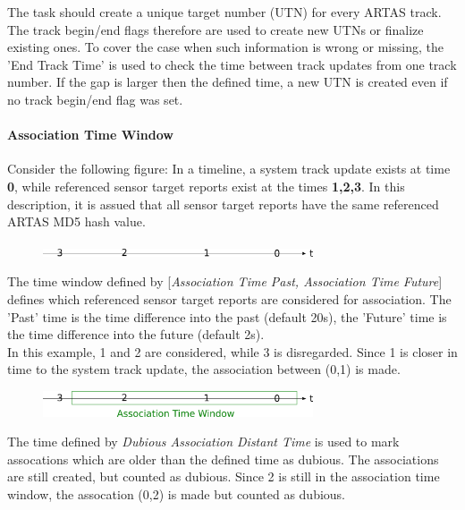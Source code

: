 The task should create a unique target number (UTN) for every ARTAS track. The track begin/end flags therefore are used to create new UTNs or finalize existing ones. To cover the case when such information is wrong or missing, the 'End Track Time' is used to check the time between track updates from one track number. If the gap is larger then the defined time, a new UTN is created even if no track begin/end flag was set.

\paragraph{Association Time Window}

Consider the following figure: In a timeline, a system track update exists at time \textbf{0}, while referenced sensor target reports exist at the times \textbf{1,2,3}. In this description, it is assued that all sensor target reports have the same referenced ARTAS MD5 hash value.


\begin{figure}[H]
  \center
    \includegraphics[width=8cm]{../screenshots/artas_assoc_timeline.png}
\end{figure}


The time window defined by [\textit{Association Time Past, Association Time Future}] defines which referenced sensor target reports are considered for association. The 'Past' time is the time difference into the past (default 20s), the 'Future' time is the time difference into the future (default 2s). \\

In this example, 1 and 2 are considered, while 3 is disregarded. Since 1 is closer in time to the system track update, the association between (0,1) is made.

\begin{figure}[H]
  \center
    \includegraphics[width=8cm]{../screenshots/artas_assoc_window.png}
\end{figure}

The time defined by \textit{Dubious Association Distant Time} is used to mark assocations which are older than the defined time as dubious. The associations are still created, but counted as dubious. Since 2 is still in the association time window, the assocation (0,2) is made but counted as dubious.

